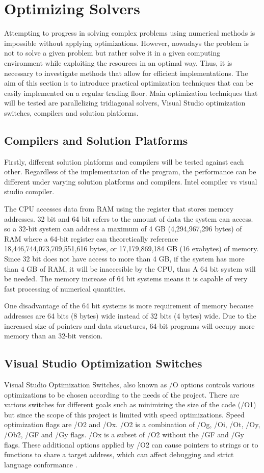 \documentclass[12pt, oneside]{book}
\theoremstyle{plain}
\theoremstyle{definition}
\begin{document}
\chapter{Optimizing Solvers}

Attempting to progress in solving complex problems using numerical methods is impossible without applying optimizations. However, nowadays the problem is not to solve a given problem but rather solve it in a given computing environment while exploiting the resources in an optimal way. Thus, it is necessary to investigate methods that allow for efficient implementations. The aim of this section is to introduce practical optimization techniques that can be easily implemented on a regular trading floor. Main optimization techniques that will be tested are parallelizing tridiagonal solvers, Visual Studio optimization switches, compilers and solution platforms.

\section{Compilers and Solution Platforms}
Firstly, different solution platforms and compilers will be tested against each other.
Regardless of the implementation of the program, the performance can be different under varying solution platforms and compilers.  
Intel compiler vs visual studio compiler.

The CPU accesses data from RAM using the register that stores memory addresses. 32 bit and 64 bit refers to the amount of data the system can access. so a 32-bit system can address a maximum of 4 GB (4,294,967,296 bytes) of RAM where a 64-bit register can theoretically reference 18,446,744,073,709,551,616 bytes, or 17,179,869,184 GB (16 exabytes) of memory. Since 32 bit does not have access to more than 4 GB, if the system has more than 4 GB of RAM, it will be inaccesible by the CPU, thus A 64 bit system will be needed. The memory increase of 64 bit systems means it is capable of very fast processing of numerical quantities.

One disadvantage of the 64 bit systems is more requirement of memory because addresses are 64 bits (8 bytes) wide instead of 32 bits (4 bytes) wide. Due to the increased size of pointers and data structures, 64-bit programs will occupy more memory than an 32-bit version.

\section{Visual Studio Optimization Switches}
Visual Studio Optimization Switches, also known as /O options controls various optimizations to be chosen according to the needs of the project. There are various switches for different goals such as minimizing the size of the code (/O1) but since the scope of this project is limited with speed optimizations. Speed optimization flags are /O2 and /Ox. /O2 is a combination of /Og, /Oi, /Ot, /Oy, /Ob2, /GF and /Gy flags. /Ox is a subset of /O2 without the  /GF and /Gy flags. These additional options applied by /O2 can cause pointers to strings or to functions to share a target address, which can affect debugging and strict language conformance  \cite{vsopt}. 
\end{document}
